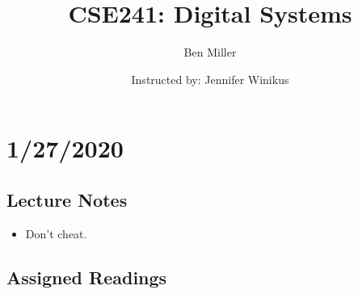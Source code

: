 \documentclass[10pt,a4paper]{article}
\title{CSE241: Digital Systems}
\author{Ben Miller}
\date{Instructed by: Jennifer Winikus}
\begin{document}
\maketitle
\pagebreak
\tableofcontents
\pagebreak
\section{1/27/2020}
\subsection{Lecture Notes}
\begin{itemize}
\item Don't cheat. 
\end{itemize}
\subsection{Assigned Readings}
\end{document}
